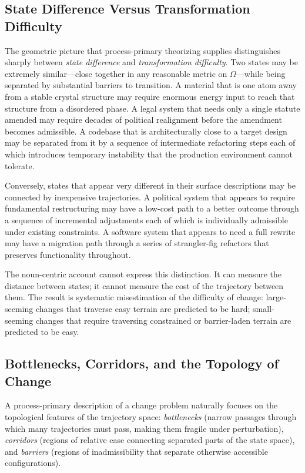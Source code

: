 \documentclass[12pt, a4paper]{article}
\theoremstyle{plain}
\theoremstyle{definition}
\theoremstyle{remark}
\begin{document}
\subsection{State Difference Versus Transformation Difficulty}

The geometric picture that process-primary theorizing supplies distinguishes
sharply between \emph{state difference} and \emph{transformation difficulty}.
Two states may be extremely similar---close together in any reasonable
metric on $\Omega$---while being separated by substantial barriers to
transition. A material that is one atom away from a stable crystal structure
may require enormous energy input to reach that structure from a disordered
phase. A legal system that needs only a single statute amended may require
decades of political realignment before the amendment becomes admissible.
A codebase that is architecturally close to a target design may be separated
from it by a sequence of intermediate refactoring steps each of which
introduces temporary instability that the production environment cannot tolerate.

Conversely, states that appear very different in their surface descriptions
may be connected by inexpensive trajectories. A political system that appears
to require fundamental restructuring may have a low-cost path to a better
outcome through a sequence of incremental adjustments each of which is
individually admissible under existing constraints. A software system that
appears to need a full rewrite may have a migration path through a series
of strangler-fig refactors that preserves functionality throughout.

The noun-centric account cannot express this distinction. It can measure the
distance between states; it cannot measure the cost of the trajectory between
them. The result is systematic misestimation of the difficulty of change:
large-seeming changes that traverse easy terrain are predicted to be hard;
small-seeming changes that require traversing constrained or barrier-laden
terrain are predicted to be easy.

\subsection{Bottlenecks, Corridors, and the Topology of Change}

A process-primary description of a change problem naturally focuses on the
topological features of the trajectory space: \emph{bottlenecks} (narrow
passages through which many trajectories must pass, making them fragile
under perturbation), \emph{corridors} (regions of relative ease connecting
separated parts of the state space), and \emph{barriers} (regions of
inadmissibility that separate otherwise accessible configurations).
\end{document}
